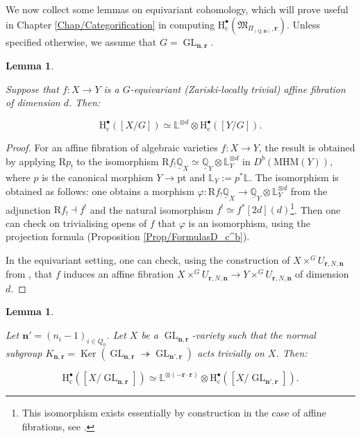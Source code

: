 \documentclass[11pt,english]{article}
\numberwithin{equation}{section}
\numberwithin{figure}{section}
\theoremstyle{definition}
\theoremstyle{plain}
\newtheorem{lem}[df]{Lemma}
\theoremstyle{remark}
\DeclareMathOperator{\Ker}{Ker}
\DeclareMathOperator{\GL}{GL}
\newcommand\nn{\mathbf{n}}
\newcommand\rr{\mathbf{r}}
\newcommand\HH{\mathrm{H}}
\newcommand\QQ{\mathbb{Q}}
\begin{document}
We now collect some lemmas on equivariant cohomology, which will prove
useful in Chapter \ref{Chap/Categorification} in computing $\HH_{\mathrm{c}}^{\bullet}(\mathfrak{M}_{\Pi_{(Q,\nn)},\rr})$.
Unless specified otherwise, we assume that $G=\GL_{\nn,\rr}$.

\begin{lem} \label{Lem/AffFib}

Suppose that $f:X\rightarrow Y$ is a $G$-equivariant (Zariski-locally
trivial) affine fibration of dimension $d$. Then:

\[
\HH_{\mathrm{c}}^{\bullet}([X/G])
\simeq
\mathbb{L}^{\otimes d}
\otimes
\HH_{\mathrm{c}}^{\bullet}([Y/G]).
\]

\end{lem}

\begin{proof}

For an affine fibration of algebraic varieties $f:X\rightarrow Y$,
the result is obtained by applying $\mathrm{R}p_{!}$ to the isomorphism
$\mathrm{R}f_{!}\underline{\QQ}_{X}\simeq\underline{\QQ}_{Y}\otimes\mathbb{L}_{Y}^{\otimes d}$
in $D^{b}(\mathrm{MHM}(Y))$, where $p$ is the canonical morphism
$Y\rightarrow\mathrm{pt}$ and $\mathbb{L}_{Y}:=p^{*}\mathbb{L}$.
The isomorphism is obtained as follows: one obtains a morphism $\varphi:\mathrm{R}f_{!}\underline{\QQ}_{X}\rightarrow\underline{\QQ}_{Y}\otimes\mathbb{L}_{Y}^{\otimes d}$
from the adjunction $\mathrm{R}f_{!}\dashv f^{!}$ and the natural
isomorphism $f^{!}\simeq f^{*}[2d](d)$\footnote{This isomorphism exists essentially by construction in the case of
affine fibrations, see \cite[\S 4.4.]{Sai89}.}. Then one can check on trivialising opens of $f$ that $\varphi$
is an isomorphism, using the projection formula (Proposition \ref{Prop/FormulasD_c^b}).

In the equivariant setting, one can check, using the construction
of $X\times^{G}U_{\rr,N,\nn}$ from \cite[Prop. 23]{EG98a}, that
$f$ induces an affine fibration $X\times^{G}U_{\rr,N,\nn}\rightarrow Y\times^{G}U_{\rr,N,\nn}$
of dimension $d$. \end{proof}

\begin{lem} \label{Lem/DepthChg}

Let $\nn'=(n_{i}-1)_{i\in Q_{0}}$. Let $X$ be a $\GL_{\nn,\rr}$-variety
such that the normal subgroup $K_{\nn,\rr}=\Ker(\GL_{\nn,\rr}\twoheadrightarrow\GL_{\nn',\rr})$
acts trivially on $X$. Then:

\[
\HH_{\mathrm{c}}^{\bullet}([X/\GL_{\nn,\rr}])
\simeq
\mathbb{L}^{\otimes (-\rr\cdot\rr)}
\otimes
\HH_{\mathrm{c}}^{\bullet}([X/\GL_{\nn',\rr}]).
\]

\end{lem}
\end{document}
